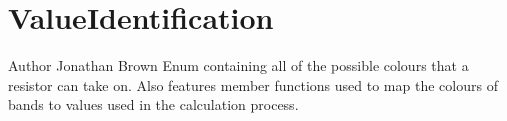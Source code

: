 \hypertarget{group___value_identification}{}\section{Value\+Identification}
\label{group___value_identification}
\begin{DoxyAuthor}{Author}
Jonathan Brown Enum containing all of the possible colours that a resistor can take on. Also features member functions used to map the colours of bands to values used in the calculation process. 
\end{DoxyAuthor}
